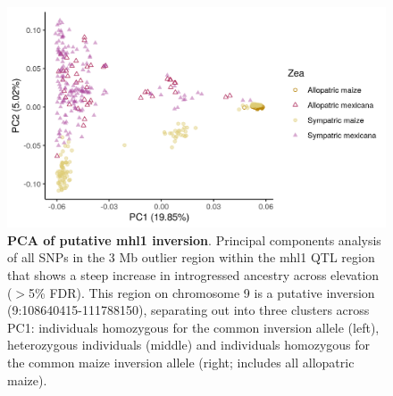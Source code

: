 \begin{figure}[ht]
\includegraphics[width=\textwidth]{chapter2/figures/mhl1_inv_pca.png}
\caption{\color{Gray} \textbf{PCA of putative mhl1 inversion}. Principal components analysis of all SNPs in the 3 Mb outlier region within the mhl1 QTL region that shows a steep increase in introgressed \mexicana ancestry across elevation ($>$5\% FDR). This region on chromosome 9 is a putative inversion (9:108640415-111788150), separating out into three clusters across PC1: individuals homozygous for the common \mexicana inversion allele (left), heterozygous individuals (middle) and individuals homozygous for the common maize inversion allele (right; includes all allopatric maize).}
\label{mhl1_pca}
\end{figure}

